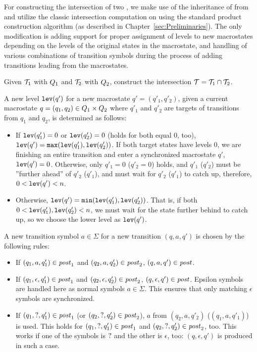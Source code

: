 For constructing the intersection of two \nfts, we make use of the inheritance of \nfts from \nfas and utilize the classic intersection computation on \nfa using the standard product construction algorithm (as described in Chapter~\ref{sec:Preliminaries}).
The only modification is adding support for proper assignment of levels to new macrostates depending on the levels of the original \nft states in the macrostate, and handling of various combinations of transition symbols during the process of adding transitions leading from the macrostates.

Given $\mathcal{T}_1$ with $Q_1$ and $\mathcal{T}_2$ with $Q_2$, construct the intersection $\mathcal{T} = \mathcal{T}_1 \cap \mathcal{T}_2$.

A new level $\texttt{lev}(q')$ for a new macrostate $q' = (q'_1, q'_2)$, given a current macrostate $q = (q_1, q_2) \in Q_1 \times Q_2$ where $q'_1$ and $q'_2$ are targets of transitions from $q_1$ and $q_2$, is determined as follows:
\begin{itemize}
  \item If $\texttt{lev}(q'_1) = 0$ or $\texttt{lev}(q'_2) = 0$ (holds for both equal $0$, too), $\texttt{lev}(q') = \texttt{max}(\texttt{lev}(q'_1), \texttt{lev}(q'_2))$. If both target states have levels $0$, we are finishing an entire \nft transition and enter a synchronized macrostate $q'$, $\texttt{lev}(q') = 0$. Otherwise, only $q'_1 = 0$ ($q'_2 = 0$) holds, and $q'_1$ ($q'_2$) must be ''further ahead'' of $q'_2$ ($q'_1$), and must wait for $q'_2$ ($q'_1$) to catch up, therefore, $0 < \texttt{lev}(q') < n$.
  \item Otherwise, $\texttt{lev}(q') = \texttt{min}(\texttt{lev}(q'_1), \texttt{lev}(q'_2))$. That is, if both $0 < \texttt{lev}(q'_1), \texttt{lev}(q'_2) < n$, we must wait for the state further behind to catch up, so we choose the lower level as $\texttt{lev}(q')$.
\end{itemize}

A new transition symbol $a \in \Sigma$ for a new transition $(q, a, q')$ is chosen by the following rules:
\begin{itemize}
  \item If $(q_1, a, q'_1) \in \mathit{post}_1$ and $(q_2, a, q'_2) \in \mathit{post}_2$, $(q, a, q') \in \mathit{post}$.
  \item If $(q_1, \epsilon, q'_1) \in \mathit{post}_1$ and $(q_2, \epsilon, q'_2) \in \mathit{post}_2$, $(q, \epsilon, q') \in \mathit{post}$. Epsilon symbols are handled here as normal symbols $a \in \Sigma$. This ensures that only matching $\epsilon$ symbols are synchronized.
  \item If $(q_1, ?, q'_1) \in \mathit{post}_1$ (or $(q_2, ?, q'_2) \in \mathit{post}_2$), $a$ from $(q_2, a, q'_2)$ ($(q_1, a, q'_1)$) is used.
  This holds for $(q_1, ?, q'_1) \in \mathit{post}_1$ and $(q_2, ?, q'_2) \in \mathit{post}_2$, too.
  This works if one of the symbols is $?$ and the other is $\epsilon$, too: $(q, \epsilon, q')$ is produced in such a case.
\end{itemize}

